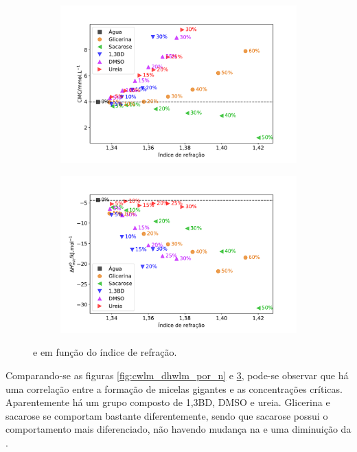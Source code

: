 		\begin{figure}[h]
			\begin{subfigure}[t]{0.5\textwidth}
				\centering
				\includegraphics[width=\textwidth]{imagens/itc/CMC_por_n}
				\caption{\cmc}
				\label{fig:cmc_por_n}
			\end{subfigure} %
			\begin{subfigure}[t]{0.5\textwidth}
				\centering
				\includegraphics[width=\textwidth]{imagens/itc/DH_por_n}
				\caption{\DHmic}
				\label{fig:dh_por_n}
			\end{subfigure}
			
			\caption{\cmc{} e \DHmic{} em função do índice de refração.}
			\label{fig:cmc_dh_por_n}
		\end{figure}

		Comparando-se as figuras \ref{fig:cwlm_dhwlm_por_n} e \ref{fig:cmc_dh_por_n}, pode-se observar que há uma correlação entre a formação de micelas gigantes e as concentrações críticas. Aparentemente há um grupo composto de 1,3BD, DMSO e ureia. Glicerina e sacarose se comportam bastante diferentemente, sendo que sacarose possui o comportamento mais diferenciado, não havendo mudança na \cwlm{} e uma diminuição da \cmc{}.
		
